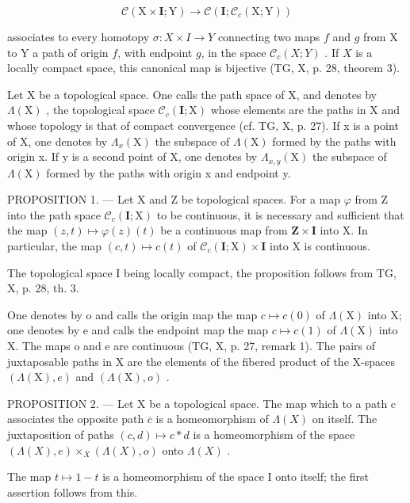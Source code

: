 \[
\mathcal {C} (\mathrm{X} \times \mathbf {I}; \mathrm{Y}) \rightarrow \mathcal {C} (\mathbf {I}; \mathcal {C} _ {c} (\mathrm{X}; \mathrm{Y}))
\]

associates to every homotopy \(\sigma\colon X \times I \to Y\) connecting two maps \(f\) and \(g\) from X to Y a path of origin \(f\), with endpoint \(g\), in the space \(\mathcal{C}_c(X;Y)\) . If \(X\) is a locally compact space, this canonical map is bijective (TG, X, p. 28, theorem 3).

Let X be a topological space. One calls the path space of X, and denotes by \(\Lambda(\mathrm{X})\) , the topological space \(\mathcal{C}_{c}(\mathbf{I};\mathrm{X})\) whose elements are the paths in X and whose topology is that of compact convergence (cf. TG, X, p. 27). If x is a point of X, one denotes by \(\Lambda_{x}(\mathrm{X})\) the subspace of \(\Lambda(\mathrm{X})\) formed by the paths with origin x. If y is a second point of X, one denotes by \(\Lambda_{x,y}(\mathrm{X})\) the subspace of \(\Lambda(\mathrm{X})\) formed by the paths with origin x and endpoint y.

PROPOSITION 1. --- Let X and Z be topological spaces. For a map \(\varphi\) from Z into the path space \(\mathcal{C}_c(\mathbf{I};\mathrm{X})\) to be continuous, it is necessary and sufficient that the map \((z,t)\mapsto \varphi (z)(t)\) be a continuous map from \(\mathbf{Z}\times \mathbf{I}\) into X. In particular, the map \((c,t)\mapsto c(t)\) of \(\mathcal{C}_c(\mathbf{I};\mathrm{X})\times \mathbf{I}\) into X is continuous.

The topological space I being locally compact, the proposition follows from TG, X, p. 28, th. 3.

One denotes by o and calls the origin map the map \(c \mapsto c(0)\) of \(\Lambda(\mathrm{X})\) into X; one denotes by e and calls the endpoint map the map \(c \mapsto c(1)\) of \(\Lambda(\mathrm{X})\) into X. The maps o and e are continuous (TG, X, p. 27, remark 1). The pairs of juxtaposable paths in X are the elements of the fibered product of the X-spaces \((\Lambda(\mathrm{X}), e)\) and \((\Lambda(\mathrm{X}), o)\) .

PROPOSITION 2. --- Let X be a topological space. The map which to a path c associates the opposite path \(\overline{c}\) is a homeomorphism of \(\Lambda(X)\) on itself. The juxtaposition of paths \((c,d)\mapsto c*d\) is a homeomorphism of the space \((\Lambda(X),e)\times_{X}(\Lambda(X),o)\) onto \(\Lambda(X)\) .

The map \(t \mapsto 1 - t\) is a homeomorphism of the space I onto itself; the first assertion follows from this.

